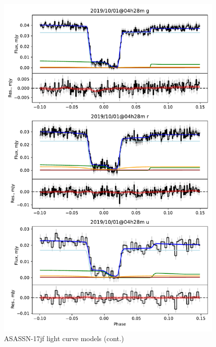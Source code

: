 \begin{figure}
    \centering
    \includegraphics[width=\textwidth]{figures/results/three_cvs_with_weird_colours/ASASSN-17jf/ASASSN-17jf_3.pdf}
    \caption{ASASSN-17jf light curve models (cont.)}
    \label{fig:ASASSN-17jf all light curves cont 2}
\end{figure}



